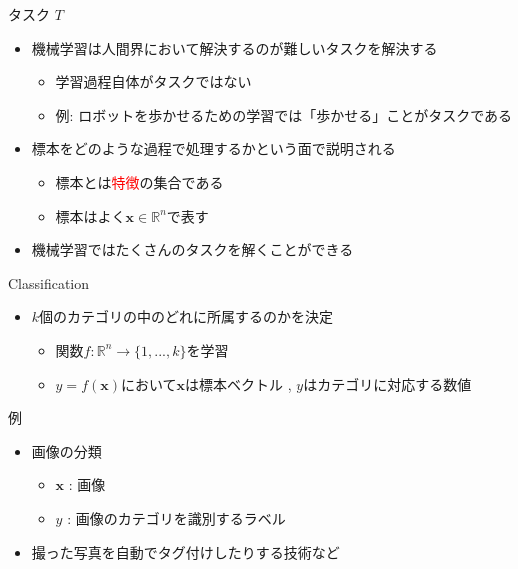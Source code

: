 \documentclass[dvipdfmx, 10pt]{beamer}
\begin{document}
\begin{frame}{タスク $T$}
  \begin{itemize}
    \item 機械学習は人間界において解決するのが難しいタスクを解決する
    \begin{itemize}
      \item 学習過程自体がタスクではない
      \item 例: ロボットを歩かせるための学習では「歩かせる」ことがタスクである
    \end{itemize}
    \item 標本をどのような過程で処理するかという面で説明される
    \begin{itemize}
      \item 標本とは\textcolor{red}{特徴}の集合である
      \item 標本はよく$\bm{x} \in \mathbb{R} ^ {n}$で表す
    \end{itemize}
    \item 機械学習ではたくさんのタスクを解くことができる
  \end{itemize}
\end{frame}


\begin{frame}{Classification}
  \begin{itemize}
    \item $k$個のカテゴリの中のどれに所属するのかを決定
    \begin{itemize}
      \item 関数$f: \mathbb{R} ^ {n} \to \{1, ..., k\}$を学習
      \item $y = f(\bm{x})$において$\bm{x}$は標本ベクトル , $y$はカテゴリに対応する数値
    \end{itemize}
  \end{itemize}
  \begin{exampleblock}{例}
    \begin{itemize}
      \item 画像の分類
      \begin{itemize}
        \item $\bm{x}$ : 画像
        \item $y$ : 画像のカテゴリを識別するラベル
      \end{itemize}
    \end{itemize}
    \begin{itemize}
      \item 撮った写真を自動でタグ付けしたりする技術など
    \end{itemize}
  \end{exampleblock}
\end{frame}
\end{document}
